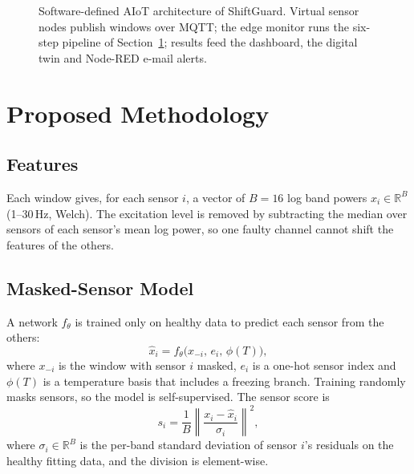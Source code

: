 \documentclass[conference]{IEEEtran}
\begin{document}
\begin{figure}[t]
\caption{Software-defined AIoT architecture of ShiftGuard. Virtual sensor nodes publish windows over MQTT; the edge monitor runs the six-step pipeline of Section~\ref{sec:method}; results feed the dashboard, the digital twin and Node-RED e-mail alerts.}
\label{fig:arch}
\end{figure}

\section{Proposed Methodology}\label{sec:method}
\subsection{Features}
Each window gives, for each sensor $i$, a vector of $B=16$ log band powers $x_i\in\mathbb{R}^B$ (1--30\,Hz, Welch). The excitation level is removed by subtracting the median over sensors of each sensor's mean log power, so one faulty channel cannot shift the features of the others.

\subsection{Masked-Sensor Model}
A network $f_\theta$ is trained only on healthy data to predict each sensor from the others:
\begin{equation}
\hat{x}_i = f_\theta\big(x_{-i},\, e_i,\, \phi(T)\big),
\end{equation}
where $x_{-i}$ is the window with sensor $i$ masked, $e_i$ is a one-hot sensor index and $\phi(T)$ is a temperature basis that includes a freezing branch. Training randomly masks sensors, so the model is self-supervised. The sensor score is
\begin{equation}
s_i = \frac{1}{B}\left\lVert \frac{x_i-\hat{x}_i}{\sigma_i} \right\rVert^2,
\end{equation}
where $\sigma_i\in\mathbb{R}^B$ is the per-band standard deviation of sensor $i$'s residuals on the healthy fitting data, and the division is element-wise.
\end{document}
